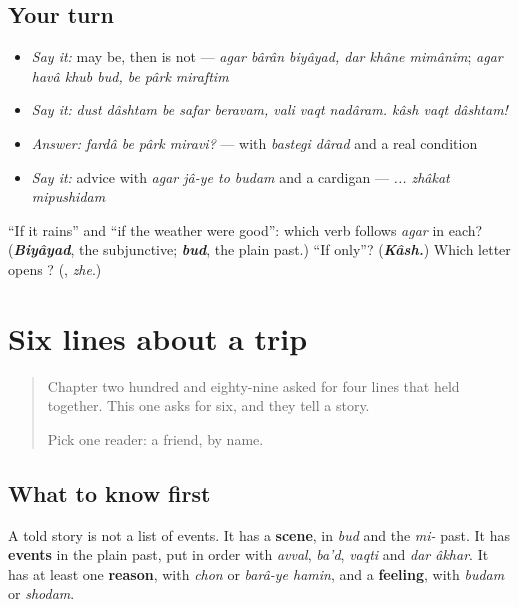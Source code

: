 \subsection*{Your turn}
\begin{itemize}
\raggedright
  \item \emph{Say it:} may be, then is not — \emph{agar bârân biyâyad, dar khâne mimânim}; \emph{agar havâ khub bud, be pârk miraftim}
  \item \emph{Say it:} \emph{dust dâshtam be safar beravam, vali vaqt nadâram. kâsh vaqt dâshtam!}
  \item \emph{Answer:} \emph{fardâ be pârk miravi?} — with \emph{bastegi dârad} and a real condition
  \item \emph{Say it:} advice with \emph{agar jâ-ye to budam} and a cardigan — \emph{... zhâkat mipushidam}
\end{itemize}

\begin{tcolorbox}[breakable,colback=teal!4,colframe=teal!35!black,title={Before you move on}]
\textquotedblleft{}If it rains\textquotedblright{} and \textquotedblleft{}if the weather were good\textquotedblright{}: which verb follows \emph{agar} in each? (\emph{\textbf{Biyâyad}}, the subjunctive; \emph{\textbf{bud}}, the plain past.) \textquotedblleft{}If only\textquotedblright{}? (\emph{\textbf{Kâsh.}}) Which letter opens \textbf{}? (\textbf{}, \emph{zhe}.)
\end{tcolorbox}
\section[(six lines)]{Six lines about a trip}

\label{lesson:FA-W299-shesh-khat}



\begin{quote}
Chapter two hundred and eighty-nine asked for four lines that held together. This one asks for six, and they tell a story.

Pick one reader: a friend, by name.
\end{quote}

\subsection*{What to know first}
A told story is not a list of events. It has a \textbf{scene}, in \emph{bud} and the \emph{mi-} past. It has \textbf{events} in the plain past, put in order with \emph{avval}, \emph{ba'd}, \emph{vaqti} and \emph{dar âkhar}. It has at least one \textbf{reason}, with \emph{chon} or \emph{barâ-ye hamin}, and a \textbf{feeling}, with \emph{budam} or \emph{shodam}.

